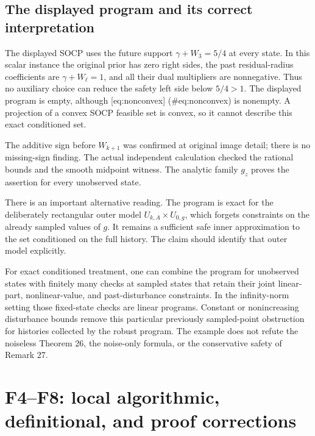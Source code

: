 \documentclass[10pt]{article}
\begin{document}
\subsection*{The displayed program and its correct interpretation}
The displayed SOCP uses the future support \(\gamma+W_3=5/4\) at every state. In this scalar instance the original prior has zero right sides, the past residual-radius coefficients are \(\gamma+W_\ell=1\), and all their dual multipliers are nonnegative. Thus no auxiliary choice can reduce the safety left side below \(5/4>1\). The displayed program is empty, although [eq:nonconvex] (\#eq:nonconvex) is nonempty. A projection of a convex SOCP feasible set is convex, so it cannot describe this exact conditioned set.\par
The additive sign before \(W_{k+1}\) was confirmed at original image detail; there is no missing-sign finding. The actual independent calculation checked the rational bounds and the smooth midpoint witness. The analytic family \(g_z\) proves the assertion for every unobserved state.\par
There is an important alternative reading. The program is exact for the deliberately rectangular outer model \(U_{k,A}\times U_{0,g}\), which forgets constraints on the already sampled values of \(g\). It remains a sufficient safe inner approximation to the set conditioned on the full history. The claim should identify that outer model explicitly.\par
For exact conditioned treatment, one can combine the program for unobserved states with finitely many checks at sampled states that retain their joint linear-part, nonlinear-value, and past-disturbance constraints. In the infinity-norm setting those fixed-state checks are linear programs. Constant or nonincreasing disturbance bounds remove this particular previously sampled-point obstruction for histories collected by the robust program. The example does not refute the noiseless Theorem 26, the noise-only formula, or the conservative safety of Remark 27.\par
\section*{F4–F8: local algorithmic, definitional, and proof corrections}
\end{document}
